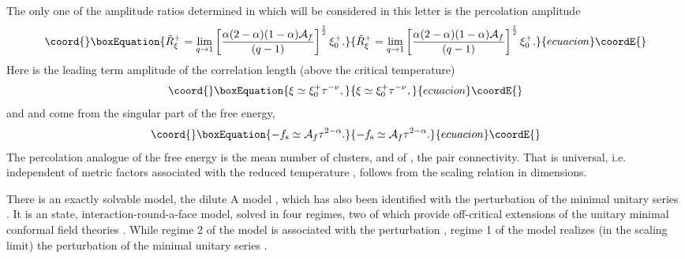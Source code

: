 \documentclass[a4paper,a4paper]{article}
\begin{document}
The only one of the amplitude ratios determined in \cite{dc}
which will be considered in this letter is the percolation
amplitude \cite{PHA, dc}
\begin{equation}\coord{}\boxEquation{
\tilde{R}_{\xi}^{+}=
\lim_{q\to 1}\left[\frac{\alpha(2-\alpha)(1-\alpha) \mathcal{A}_f}{(q-1)}
\right]^{\frac{1}{2}}\xi_{0}^{+}. \label{Imp}
}{
\tilde{R}_{\xi}^{+}=
\lim_{q\to 1}\left[\frac{\alpha(2-\alpha)(1-\alpha) \mathcal{A}_f}{(q-1)}
\right]^{\frac{1}{2}}\xi_{0}^{+}. }{ecuacion}\coordE{}\end{equation}
Here 
\coordHE{} is the leading term amplitude of the correlation length
(above the critical temperature)
\begin{equation*}\coord{}\boxEquation{
\xi \simeq \xi_0^{+} \tau^{-\nu},
}{
\xi \simeq \xi_0^{+} \tau^{-\nu},
}{ecuacion}\coordE{}\end{equation*}
and \coordHE{} and \myHighlight{$\alpha$}\coordHE{} come from the singular 
part of the free energy, 
\begin{equation*}\coord{}\boxEquation{
-f_{\rm s} \simeq {\mathcal
A}_f \tau^{2-\alpha}.
}{
-f_{\rm s} \simeq {\mathcal
A}_f \tau^{2-\alpha}.
}{ecuacion}\coordE{}\end{equation*}
The percolation analogue of the free energy is the mean number of clusters, 
and of
\myHighlight{$\xi$}\coordHE{}, the pair connectivity.
That \coordHE{} is universal, i.e. independent of metric factors 
associated
with the reduced temperature \coordHE{},  follows
from the scaling relation \coordHE{} in \coordHE{} dimensions. 


There is an exactly solvable model, the dilute A\coordHE{} model
\cite{WNS}, which has also been identified with the
\coordHE{} perturbation of the minimal unitary series \cite{WPSN}.
It is an \coordHE{} state, 
interaction-round-a-face model, solved in four regimes,
two of which provide off-critical extensions of the unitary minimal conformal
field theories \cite{WPSN}.  While regime 2 of the model is associated with
the perturbation \coordHE{}, regime 1 of the model realizes
(in the scaling limit) the perturbation \coordHE{} of the minimal
unitary series \coordHE{}.
\end{document}
